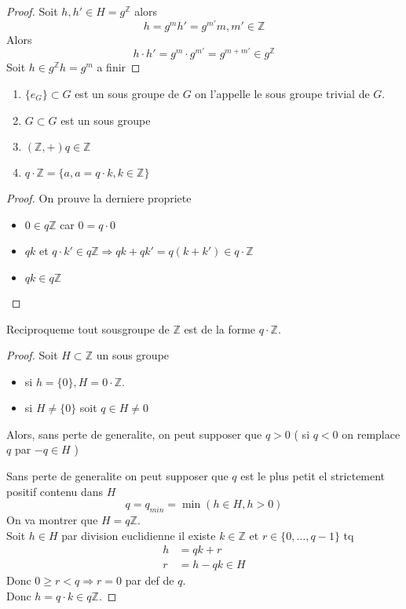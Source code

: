 \documentclass[../main.tex]{subfiles}
\begin{document}
\begin{proof}
Soit $h,h' \in H = g^{\mathbb{Z}}$ alors
\[ 
h= g^{m} h'=g^{m'} m,m'\in \mathbb{Z}
\]
Alors
\[ 
h\cdot h' = g^{m} \cdot g^{m'} = g^{m+m'} \in g^{\mathbb{Z}}
\]
Soit $h\in g^{\mathbb{Z}} h=g^{m}$
a finir
\end{proof}
\begin{exemple}
	\begin{enumerate}
		\item $\{e_G\}\subset G$ est un sous groupe de $G$ on l'appelle le sous groupe trivial de $G$.\\
		\item $G\subset G$ est un sous groupe \\
		\item $(\mathbb{Z},+) q \in \mathbb{Z}$ \\
		\item $q\cdot \mathbb{Z} = \{a, a=q\cdot k, k\in \mathbb{Z}\}$
	\end{enumerate}
	
\end{exemple}
\begin{proof}
On prouve la derniere propriete
\begin{itemize}
	\item $0 \in q \mathbb{Z}$ car $0=q\cdot 0$ \\
	\item $qk$ et $q\cdot k' \in q\mathbb{Z} \Rightarrow qk + qk'=q(k+k') \in q\cdot \mathbb{Z}$ \\
	\item $qk \in q\mathbb{Z}$
\end{itemize}
\end{proof}

\begin{thm}\label{thm:sous_groupe_de_mathbb_z_}
Reciproqueme tout sousgroupe de $\mathbb{Z}$ est de la forme $q\cdot \mathbb{Z}$.
\end{thm}
\begin{proof}
Soit $H \subset \mathbb{Z}$ un sous groupe
\begin{itemize}
	\item si $h=\{0\}, H = 0\cdot \mathbb{Z}$.\\
	\item si $H\neq \{0\}$ soit $q\in H \neq 0$
\end{itemize}
Alors, sans perte de generalite, on peut supposer que $q>0$ ( si $q<0$ on remplace $q$ par $-q \in H$ )

Sans perte de generalite on peut supposer que $q$ est le plus petit el strictement positif contenu dans $H$ 
\[ 
	q=q_{min}=\min(h\in H, h>0)
\]
On va montrer que $H=q\mathbb{Z}$.\\
Soit $h\in H$ par division euclidienne il existe $k\in \mathbb{Z}$  et $r\in \{0,\ldots,q-1\}$ tq
\begin{align*}
	h&=qk+r\\
r&=h-qk \in H 
\end{align*}
Donc $0 \geq r < q \Rightarrow r=0$ par def de $q$.\\
Donc $h=q\cdot k \in q\mathbb{Z}$.

\end{proof}
\end{document}
